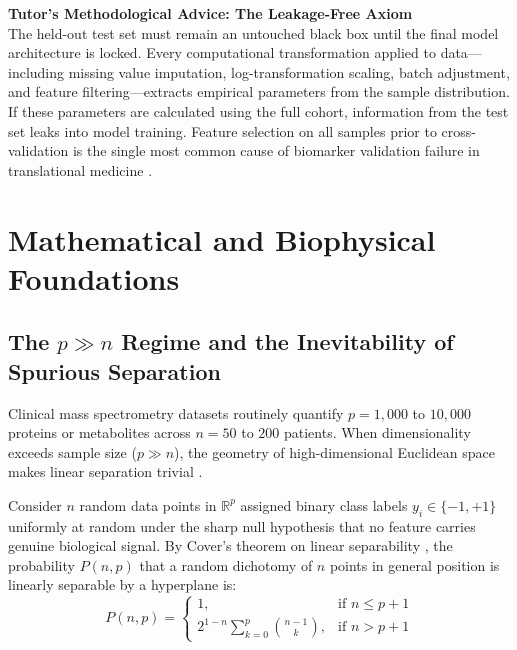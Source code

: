 \documentclass[11pt,twoside,openright]{book}
\begin{document}
\FloatBarrier

\begin{notebox}
\textbf{Tutor's Methodological Advice: The Leakage-Free Axiom}\\
The held-out test set must remain an untouched black box until the final model architecture is locked. Every computational transformation applied to data---including missing value imputation, log-transformation scaling, batch adjustment, and feature filtering---extracts empirical parameters from the sample distribution. If these parameters are calculated using the full cohort, information from the test set leaks into model training. Feature selection on all samples prior to cross-validation is the single most common cause of biomarker validation failure in translational medicine \cite{ambroise2002selection, collins2015transparent}.
\end{notebox}

\section{Mathematical and Biophysical Foundations}

\subsection{The \texorpdfstring{$p \gg n$}{p >> n} Regime and the Inevitability of Spurious Separation}

Clinical mass spectrometry datasets routinely quantify $p = 1,000$ to $10,000$ proteins or metabolites across $n = 50$ to $200$ patients. When dimensionality exceeds sample size ($p \gg n$), the geometry of high-dimensional Euclidean space makes linear separation trivial \cite{hastie2009elements}.

Consider $n$ random data points in $\mathbb{R}^p$ assigned binary class labels $y_i \in \{-1, +1\}$ uniformly at random under the sharp null hypothesis that no feature carries genuine biological signal. By Cover's theorem on linear separability \cite{cover1965geometrical}, the probability $P(n, p)$ that a random dichotomy of $n$ points in general position is linearly separable by a hyperplane is:
\begin{equation}
P(n, p) = 
\begin{cases}
1, & \text{if } n \le p + 1 \\
2^{1 - n} \sum_{k=0}^{p} \binom{n - 1}{k}, & \text{if } n > p + 1
\end{cases}
\label{eq:cover_theorem}
\end{equation}
\end{document}
